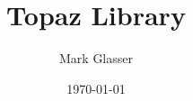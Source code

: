 \documentclass{article}
\begin{document}
\title{Topaz Library}
\author{Mark Glasser}
\date{\today}
\maketitle
\end{document}
